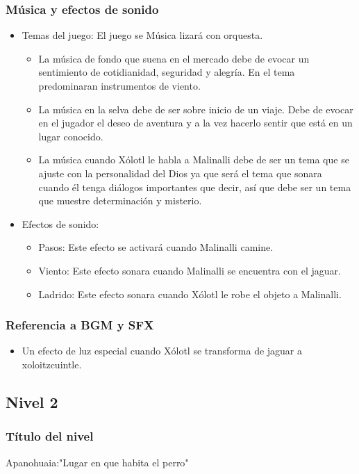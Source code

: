 \documentclass[11pt,letterpaper]{article}
\begin{document}
\subsubsection{Música y efectos de sonido}
\begin{itemize} 
\item Temas del juego: El juego se Música lizará con orquesta.
\begin{itemize}
		\item La música de fondo que suena en el mercado debe de evocar un sentimiento de cotidianidad, seguridad y alegría. En el tema predominaran instrumentos de viento.
		\item La música en la selva debe de ser sobre inicio de un viaje. Debe de evocar en el jugador el deseo de aventura y a la vez hacerlo sentir que está en un lugar conocido.
		\item La música cuando Xólotl le habla a Malinalli debe de ser un tema que se ajuste con la personalidad del Dios ya que será el tema que sonara cuando él tenga diálogos importantes que decir, así que debe ser un tema que muestre determinación y misterio.
\end{itemize} 
\item Efectos de sonido:
	\begin{itemize}
		\item Pasos: Este efecto se activará cuando Malinalli camine.
		\item Viento: Este efecto sonara cuando Malinalli se encuentra con el jaguar.
		\item Ladrido: Este efecto sonara cuando Xólotl le robe el objeto a Malinalli.
\end{itemize}
\end{itemize}
\subsubsection{Referencia a BGM y SFX}
\begin{itemize}
	\item Un efecto de luz especial cuando Xólotl se transforma de jaguar a xoloitzcuintle.

\end{itemize}



	
		\subsection{Nivel 2}
	\subsubsection{Título del nivel}
	Apanohuaia:"Lugar en que habita el perro"
\end{document}
